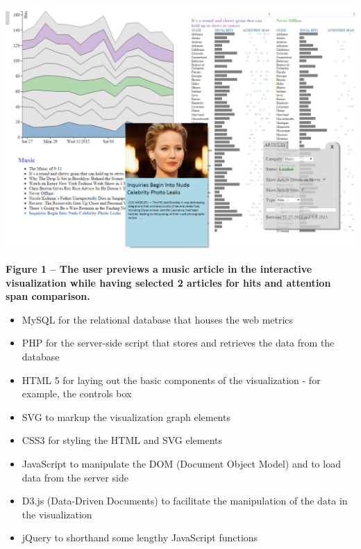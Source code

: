 \documentclass[12pt]{article}
\begin{document}
\noindent\includegraphics[scale=0.4]{img/in_action} \\

\begin{singlespace}
\noindent\textbf{Figure 1 -- The user previews a music article in the interactive visualization while having selected 2 articles for hits and attention span comparison.}
\end{singlespace}

\newpage

\begin{itemize}
\item MySQL for the relational database that houses the web metrics
\item PHP for the server-side script that stores and retrieves the data from the database
\item HTML 5 for laying out the basic components of the visualization - for example, the controls box
\item SVG to markup the visualization graph elements
\item CSS3 for styling the HTML and SVG elements
\item JavaScript to manipulate the DOM (Document Object Model) and to load data from the server side
\item D3.js (Data-Driven Documents) to facilitate the manipulation of the data in the visualization
\item jQuery to shorthand some lengthy JavaScript functions
\end{itemize}
\end{document}
